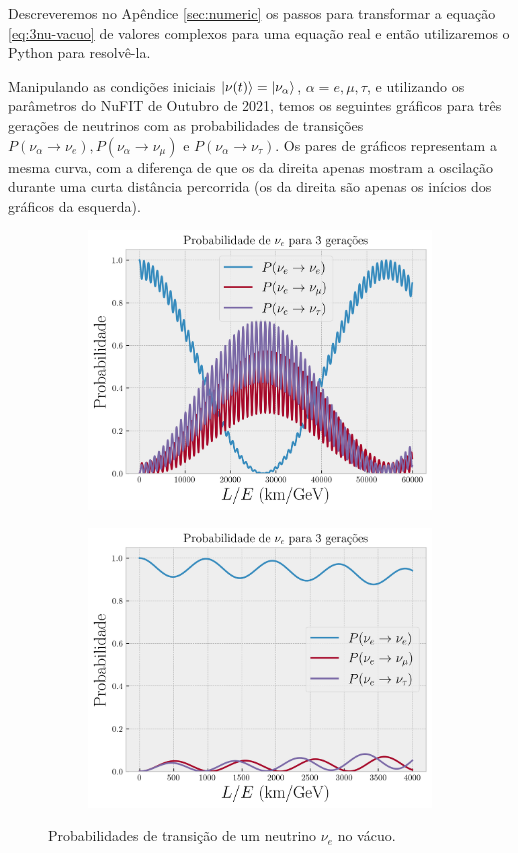 \documentclass[12pt]{report}
\begin{document}
Descreveremos no Apêndice \ref{sec:numeric} os passos para transformar a equação \ref{eq:3nu-vacuo} de valores complexos para uma equação real e então utilizaremos o Python para resolvê-la.

Manipulando as condições iniciais $\ket{\nu(t)} = \ket{\nu_\alpha}$, $\alpha = e, \mu, \tau$, e utilizando os parâmetros do NuFIT de Outubro de 2021, temos os seguintes gráficos para três gerações de neutrinos com as probabilidades de transições $P(\nu_\alpha \to \nu_e), P(\nu_\alpha \to \nu_\mu)$ e $P(\nu_\alpha \to \nu_\tau)$. Os pares de gráficos representam a mesma curva, com a diferença de que os da direita apenas mostram a oscilação durante uma curta distância percorrida (os da direita são apenas os inícios dos gráficos da esquerda).

\begin{figure}[H]
\centering
\begin{subfigure}{.5\textwidth}
  \centering
  \includegraphics[width=.75\linewidth]{fig/3nu-vacuo-e.png}
  \caption{}
  \label{fig:vacuo-e}
\end{subfigure}%
\begin{subfigure}{.5\textwidth}
  \centering
  \includegraphics[width=.75\linewidth]{fig/3nu-vacuo-e_short.png}
  \caption{}
  \label{fig:vacuo-e_short}
\end{subfigure}
\caption{Probabilidades de transição de um neutrino $\nu_e$ no vácuo.}
\label{fig:vacuo_electron}
\end{figure}
\end{document}
